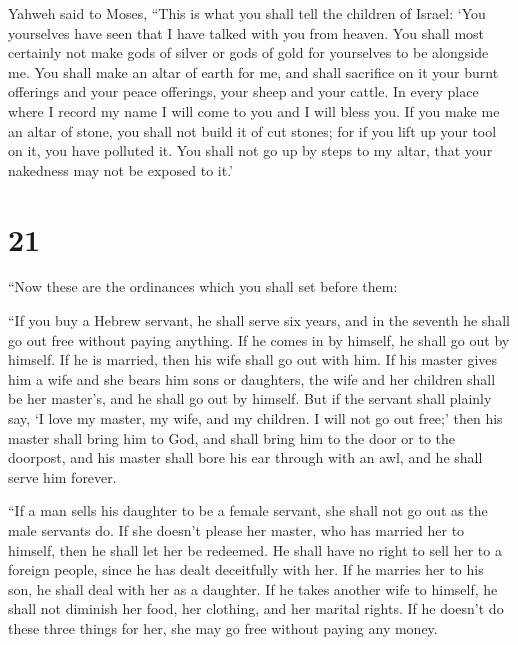  Yahweh said to Moses, ``This is what you shall tell the
children of Israel: `You yourselves have seen that I have talked with
you from heaven.  You shall most certainly not make gods of
silver or gods of gold for yourselves to be alongside me. 
You shall make an altar of earth for me, and shall sacrifice on it your
burnt offerings and your peace offerings, your sheep and your cattle. In
every place where I record my name I will come to you and I will bless
you.  If you make me an altar of stone, you shall not build
it of cut stones; for if you lift up your tool on it, you have polluted
it.  You shall not go up by steps to my altar, that your
nakedness may not be exposed to it.'

\hypertarget{section-20}{%
\section{21}\label{section-20}}

 ``Now these are the ordinances which you shall set before
them:

 ``If you buy a Hebrew servant, he shall serve six years,
and in the seventh he shall go out free without paying anything.
 If he comes in by himself, he shall go out by himself. If
he is married, then his wife shall go out with him.  If his
master gives him a wife and she bears him sons or daughters, the wife
and her children shall be her master's, and he shall go out by himself.
 But if the servant shall plainly say, `I love my master, my
wife, and my children. I will not go out free;'  then his
master shall bring him to God, and shall bring him to the door or to the
doorpost, and his master shall bore his ear through with an awl, and he
shall serve him forever.

 ``If a man sells his daughter to be a female servant, she
shall not go out as the male servants do.  If she doesn't
please her master, who has married her to himself, then he shall let her
be redeemed. He shall have no right to sell her to a foreign people,
since he has dealt deceitfully with her.  If he marries her
to his son, he shall deal with her as a daughter.  If he
takes another wife to himself, he shall not diminish her food, her
clothing, and her marital rights.  If he doesn't do these
three things for her, she may go free without paying any money.

